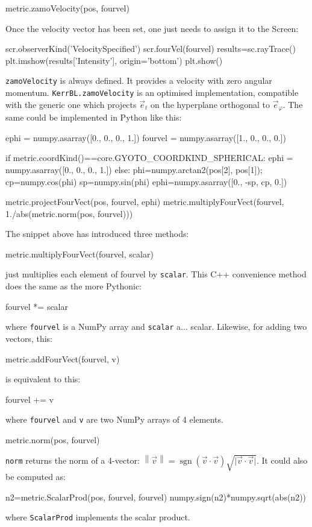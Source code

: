 \documentclass[a4paper,12pt]{article}
\DeclareMathOperator{\sgn}{sgn}
\begin{document}
\begin{code}
  metric.zamoVelocity(pos, fourvel)
\end{code}

Once the velocity vector has been set, one just needs to assign it to
the Screen:

\begin{code}
  scr.observerKind('VelocitySpecified')
  scr.fourVel(fourvel)
  results=sc.rayTrace()
  plt.imshow(results['Intensity'], origin='bottom')
  plt.show()
\end{code}

\texttt{zamoVelocity} is always defined. It provides a velocity with
zero angular momentum. \texttt{KerrBL.zamoVelocity} is an optimised
implementation, compatible with the generic one which projects $\vec
e_t$ on the hyperplane orthogonal to $\vec e_\varphi$. The same could
be implemented in Python like this:
\begin{code}
  ephi    = numpy.asarray([0., 0., 0., 1.])
  fourvel = numpy.asarray([1., 0., 0., 0.])

  if metric.coordKind()==core.GYOTO_COORDKIND_SPHERICAL:
      ephi    = numpy.asarray([0., 0., 0., 1.])
  else:
      phi=numpy.arctan2(pos[2], pos[1]);
      cp=numpy.cos(phi)
      sp=numpy.sin(phi)
      ephi=numpy.asarray([0., -sp, cp, 0.])

  metric.projectFourVect(pos, fourvel, ephi)
  metric.multiplyFourVect(fourvel, 1./abs(metric.norm(pos, fourvel)))
\end{code}

The snippet above has introduced three methods:
\begin{code}
  metric.multiplyFourVect(fourvel, scalar) 
\end{code}
just multiplies each element of fourvel by \texttt{scalar}. This C++
convenience method does the same as the more Pythonic:
\begin{code}
  fourvel *= scalar
\end{code}
where \texttt{fourvel} is a NumPy array and \texttt{scalar}
a... scalar. Likewise, for adding two vectors, this:
\begin{code}
  metric.addFourVect(fourvel, v)
\end{code}
is equivalent to this:
\begin{code}
  fourvel += v
\end{code}
where \texttt{fourvel} and \texttt{v} are two NumPy arrays of 4 elements.

\begin{code}
  metric.norm(pos, fourvel)
\end{code}
\texttt{norm} returns the norm of a 4-vector:
$\left\lVert\vec{v}\right\rVert=\sgn(\vec{v}\cdot\vec{v})\sqrt{\lvert\vec{v}\cdot\vec{v}\rvert}$. It
could also be computed as:
\begin{code}
  n2=metric.ScalarProd(pos, fourvel, fourvel)
  numpy.sign(n2)*numpy.sqrt(abs(n2))
\end{code}
where \texttt{ScalarProd} implements the scalar product.
\end{document}
